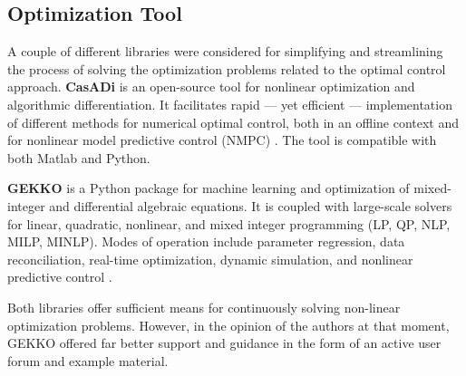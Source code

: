 \subsection{Optimization Tool}
A couple of different libraries were considered for simplifying and streamlining the process of solving the optimization problems related to the optimal control approach. \newline
\newline
\noindent \textbf{CasADi} is an open-source tool for nonlinear optimization and algorithmic differentiation.
It facilitates rapid — yet efficient — implementation of different methods for numerical optimal control, both in an offline context and for nonlinear model predictive control (NMPC) \cite{Andersson2018}. The tool is compatible with both Matlab and Python.\newline

\noindent \textbf{GEKKO} is a Python package for machine learning and optimization of mixed-integer and differential algebraic equations. It is coupled with large-scale solvers for linear, quadratic, nonlinear, and mixed integer programming (LP, QP, NLP, MILP, MINLP). Modes of operation include parameter regression, data reconciliation, real-time optimization, dynamic simulation, and nonlinear predictive control \cite{beal2018gekko}.\newline

\noindent Both libraries offer sufficient means for continuously solving non-linear optimization problems. However, in the opinion of the authors at that moment, GEKKO offered far better support and guidance in the form of an active user forum and example material.

